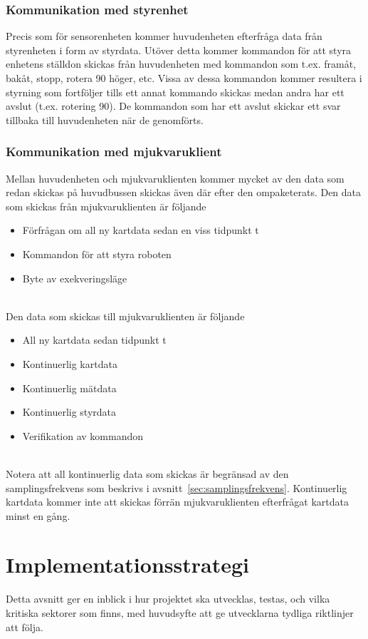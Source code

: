 \documentclass{article}
\begin{document}
\subsubsection{Kommunikation med styrenhet}
Precis som för sensorenheten kommer huvudenheten efterfråga data från styrenheten i form av styrdata. Utöver detta kommer kommandon för att styra enhetens ställdon skickas från huvudenheten med kommandon som t.ex. framåt, bakåt, stopp, rotera 90{\textdegree} höger, etc. Vissa av dessa kommandon kommer resultera i styrning som fortföljer tills ett annat kommando skickas medan andra har ett avslut (t.ex. rotering 90{\textdegree}). De kommandon som har ett avslut skickar ett svar tillbaka till huvudenheten när de genomförts.

\subsubsection{Kommunikation med mjukvaruklient}
Mellan huvudenheten och mjukvaruklienten kommer mycket av den data som redan skickas på huvudbussen skickas även där efter den ompaketerats.
\newline\newline
Den data som skickas från mjukvaruklienten är följande
\begin{itemize}
\item Förfrågan om all ny kartdata sedan en viss tidpunkt t
\item Kommandon för att styra roboten
\item Byte av exekveringsläge
\end{itemize}
\ \\
Den data som skickas till mjukvaruklienten är följande
\begin{itemize}
\item All ny kartdata sedan tidpunkt t
\item Kontinuerlig kartdata
\item Kontinuerlig mätdata
\item Kontinuerlig styrdata
\item Verifikation av kommandon
\end{itemize}
\ \\
Notera att all kontinuerlig data som skickas är begränsad av den samplingsfrekvens som beskrivs i avsnitt~\ref{sec:samplingsfrekvens}. Kontinuerlig kartdata kommer inte att skickas förrän mjukvaruklienten efterfrågat kartdata minst en gång.

\clearpage

\section{Implementationsstrategi}
Detta avsnitt ger en inblick i hur projektet ska utvecklas, testas, och vilka kritiska sektorer som finns, med huvudsyfte att ge utvecklarna tydliga riktlinjer att följa.
\end{document}
